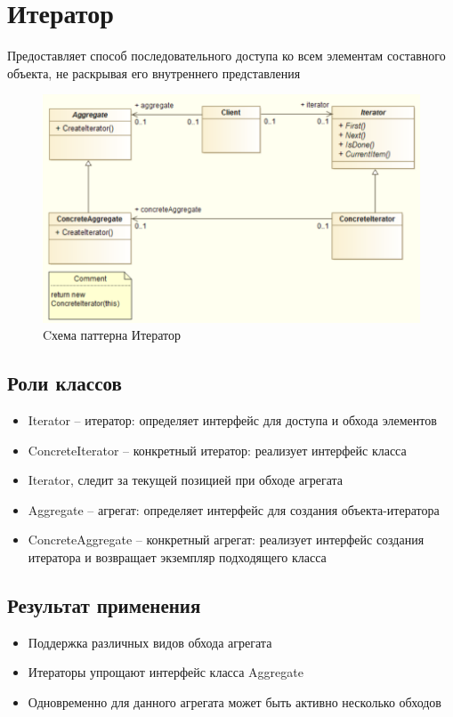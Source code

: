 \section{Итератор}
Предоставляет способ последовательного доступа ко всем элементам
составного объекта, не раскрывая его внутреннего представления
\begin{figure}[!ht]
\begin{center}
\includegraphics[scale=0.7]{images/pic/pic28-2.png}\caption{Cхема паттерна Итератор}\label{figure1}
\end{center}
\end{figure}
\subsection{Роли классов}
\begin{itemize}
    \item Iterator – итератор: определяет интерфейс для доступа и обхода элементов
    \item ConcreteIterator – конкретный итератор: реализует интерфейс класса
    \item Iterator, следит за текущей позицией при обходе агрегата
    \item Aggregate – агрегат: определяет интерфейс для создания объекта-итератора
    \item ConcreteAggregate – конкретный агрегат: реализует интерфейс создания итератора и возвращает экземпляр подходящего класса
\end{itemize}
\subsection{Результат применения}
\begin{itemize}
    \item Поддержка различных видов обхода агрегата
    \item Итераторы упрощают интерфейс класса Aggregate
    \item Одновременно для данного агрегата может быть активно несколько обходов
\end{itemize}
